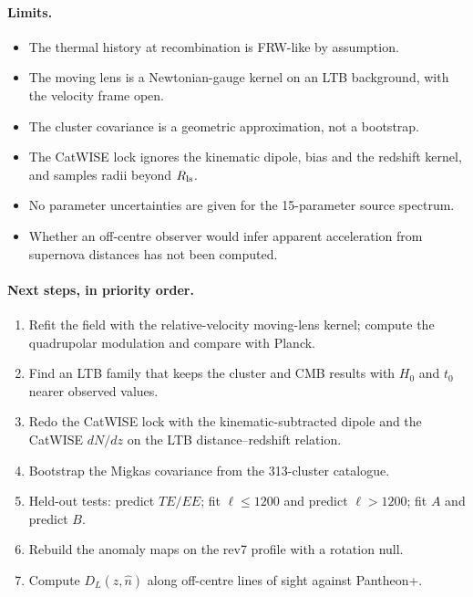 \documentclass[11pt]{article}
\begin{document}
\paragraph{Limits.}
\begin{itemize}
\item The thermal history at recombination is FRW-like by assumption.
\item The moving lens is a Newtonian-gauge kernel on an LTB background, with the velocity frame open.
\item The cluster covariance is a geometric approximation, not a bootstrap.
\item The CatWISE lock ignores the kinematic dipole, bias and the redshift kernel, and samples radii beyond $R_{\rm ls}$.
\item No parameter uncertainties are given for the 15-parameter source spectrum.
\item Whether an off-centre observer would infer apparent acceleration from supernova distances has not been computed.
\end{itemize}

\paragraph{Next steps, in priority order.}
\begin{enumerate}
\item Refit the field with the relative-velocity moving-lens kernel; compute the quadrupolar modulation and compare with Planck.
\item Find an LTB family that keeps the cluster and CMB results with $H_0$ and $t_0$ nearer observed values.
\item Redo the CatWISE lock with the kinematic-subtracted dipole and the CatWISE $dN/dz$ on the LTB distance--redshift relation.
\item Bootstrap the Migkas covariance from the 313-cluster catalogue.
\item Held-out tests: predict $TE/EE$; fit $\ell\le1200$ and predict $\ell>1200$; fit $A$ and predict $B$.
\item Rebuild the anomaly maps on the rev7 profile with a rotation null.
\item Compute $D_L(z,\hat n)$ along off-centre lines of sight against Pantheon+.
\end{enumerate}
\end{document}
